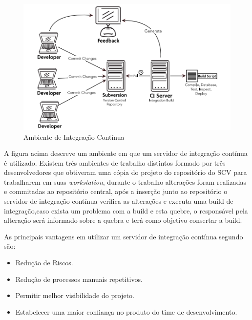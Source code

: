 \begin{figure}[tbh]
\centering
\includegraphics[width=0.7\linewidth]{./images/CI}
\caption[Ambiente de Integração Contínua]{Ambiente de Integração Contínua}
\label{fig:CI}
\end{figure}

A figura acima descreve um ambiente em que um servidor de integração contínua é utilizado. Existem três ambientes de trabalho distintos formado por três desenvolvedores que obtiveram uma cópia do projeto do repositório do SCV para trabalharem em suas \textit{workstation}, durante o trabalho alterações foram realizadas e commitadas ao repositório central, após a inserção junto ao repositório o servidor de integração contínua verifica as alterações e executa uma build de integração,caso exista um problema com a build e esta quebre, o responsável pela alteração será informado sobre a quebra e terá como objetivo consertar a build.

As principais vantagens em utilizar um servidor de integração contínua segundo  são:

\begin{itemize}
\item Redução de Riscos.
\item Redução de processos manuais repetitivos.
\item Permitir melhor visibilidade do projeto.
\item Estabelecer uma maior confiança no produto do time de desenvolvimento.
\end{itemize}

